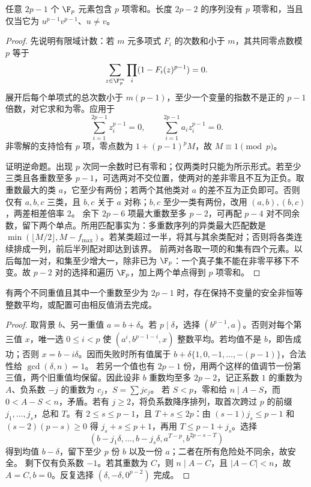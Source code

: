 \begin{lemma}[素数零和选择及逆边界]\label{lem:egz}
任意 $2p-1$ 个 $\F_p$ 元素包含 $p$ 项零和。长度 $2p-2$ 的序列没有 $p$ 项零和，当且仅当它为 $u^{p-1}v^{p-1}$、$u\ne v$。
\end{lemma}
\begin{proof}
先说明有限域计数：若 $m$ 元多项式 $F_i$ 的次数和小于 $m$，其共同零点数模 $p$ 等于
\[\sum_{z\in\F_p^m}\prod_i(1-F_i(z)^{p-1})=0.
\]
展开后每个单项式的总次数小于 $m(p-1)$，至少一个变量的指数不是正的 $p-1$ 倍数，对它求和为零。应用于
\[\sum_{i=1}^{2p-1}z_i^{p-1}=0,\qquad
\sum_{i=1}^{2p-1}a_i z_i^{p-1}=0.
\]
非零解的支持恰有 $p$ 项，零点数为 $1+(p-1)^p M$，故 $M\equiv1\pmod p$。

证明逆命题。出现 $p$ 次同一余数时已有零和；仅两类时只能为所示形式。若至少三类且各重数至多 $p-1$，可选两对不交位置，使两对的差非零且不互为正负。取重数最大的类 $a$，它至少有两份；若两个其他类对 $a$ 的差不互为正负即可。否则仅有 $a,b,c$ 三类，且 $b,c$ 关于 $a$ 对称；$b,c$ 至少一类有两份，改用 $(a,b),(b,c)$，两差相差倍率 $2$。
余下 $2p-6$ 项最大重数至多 $p-2$，可再配 $p-4$ 对不同余数，留下两个单点。所用匹配事实为：多重数序列的异类最大匹配数是 $\min(\lfloor M/2\rfloor,M-f_{\max})$。若某类超过一半，将其与其余类配对；否则将各类连续排成一列，前后半列配对即达到该界。
前两对各取一项的和集有四个元素。以后每加一对，和集至少增大一，除非已为 $\F_p$：一个真子集不能在非零平移下不变。故 $p-2$ 对的选择和遍历 $\F_p$，加上两个单点得到 $p$ 项零和。
\end{proof}

\begin{lemma}\label{lem:background}
有两个不同重值且其中一个重数至少为 $2p-1$ 时，存在保持不变量的安全非恒等整数平均，或配置可由相反值消去完成。
\end{lemma}
\begin{proof}
取背景 $b$、另一重值 $a=b+\delta$。若 $p\mid\delta$，选择 $(b^{p-1},a)$。否则对每个第三值 $x$，唯一选 $0\le i<p$ 使 $(a^i,b^{p-1-i},x)$ 整数平均。若均值不是 $b$，即告成功；否则 $x=b-i\delta$。因而失败时所有值属于 $b+\delta\{1,0,-1,\ldots,-(p-1)\}$，合法性给 $\gcd(\delta,n)=1$。
若另一个值也有 $2p-1$ 份，用两个这样的值调节一份第三值，两个旧重值均保留。因此设非 $b$ 重数均至多 $2p-2$，记正系数 $1$ 的重数为 $A$、负系数 $-j$ 的重数为 $c_j$，$S=\sum j c_j$。
若 $S<p$，零和给 $n\mid A-S$，而 $0<A-S<n$，矛盾。若有 $j\ge2$，将负系数降序排列，取首次跨过 $p$ 的前缀 $j_1,\ldots,j_s$，总和 $T$。有 $2\le s\le p-1$，且 $T+s\le2p$：由 $(s-1)j_s\le p-1$ 和 $(s-2)(p-s)\ge0$ 得 $j_s+s\le p+1$，再用 $T\le p-1+j_s$。选择
\[(b-j_1\delta,\ldots,b-j_s\delta,a^{T-p},b^{2p-s-T})
\]
得到均值 $b-\delta$，留下至少 $p$ 份 $b$ 以及一份 $a$；二者在所有危险处不同余，故安全。
剩下仅有负系数 $-1$。若其重数为 $C$，则 $n\mid A-C$，且 $|A-C|<n$，故 $A=C,b=0$。反复选择 $(\delta,-\delta,0^{p-2})$ 完成。
\end{proof}

